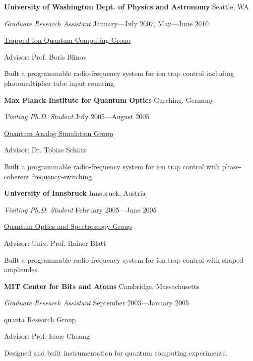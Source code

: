 \documentclass[letter]{article}
\begin{document}
\vspace{\baselineskip}
\par
{\bf {University of Washington Dept. of Physics and Astronomy}} \hfill Seattle, WA
\par
{\em Graduate Research Assistant} \hfill January---July 2007, May---June 2010
\par
\href{http://depts.washington.edu/qcomp/}{Trapped Ion Quantum Computing Group}
\par
Advisor: Prof. Boris Blinov
\par
Built a programmable radio-frequency system for ion trap control including
photomultiplier tube input counting.

\par

\vspace{\baselineskip}
\par
{\bf Max Planck Institute for Quantum Optics} \hfill Garching, Germany
\par
{\em Visiting Ph.D. Student} \hfill July 2005---August 2005
\par
\href{http://www.mpq.mpg.de/qsim/}{Quantum Analog Simulation Group}
\par
Advisor: Dr. Tobias Sch\"atz
\par
Built a programmable radio-frequency system for ion trap control with phase-coherent
frequency-switching.

\par

\vspace{\baselineskip}
\par
{\bf University of Innsbruck} \hfill Innsbruck, Austria
\par
{\em Visiting Ph.D. Student} \hfill February 2005---June 2005
\par
\href{http://heart-c704.uibk.ac.at/index.html}{Quantum Optics and Spectroscopy Group}
\par
Advisor: Univ. Prof. Rainer Blatt
\par
Built a programmable radio-frequency system for ion trap control with shaped amplitudes.
\par

\vspace{\baselineskip}
\par
{\bf MIT Center for Bits and Atoms} \hfill Cambridge, Massachusetts
\par
{\em Graduate Research Assistant} \hfill September 2003---January 2005
\par
\href{http://web.mit.edu/~cua/www/quanta/}{quanta Research Group}
\par
Advisor: Prof. Isaac Chuang
\par
Designed and built instrumentation for quantum computing experiments.
\par
\end{document}
